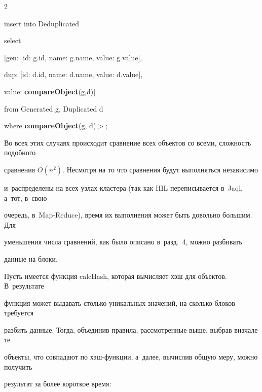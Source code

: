 \begin{multicols}{2}
{\sf



\noindent

  insert into Deduplicated



\noindent

  select



\noindent

  [gen: [id: g.id, name: g.name, value: g.value],



\noindent

  dup: [id: d.id, name: d.name, value: d.value],



\noindent

  value: {\textbf{compareObject}}(g,d)]



\noindent

  from Generated g, Duplicated d



\noindent

  where {\textbf{compareObject}}(g, d)\;$>$;

  }



  Во всех этих случаях происходит сравнение всех объектов со всеми, сложность подобного

сравнения $O(n^2)$. Несмотря на то что сравнения будут выполняться независимо

и~распределены на всех узлах кластера (так как HIL переписывается в~Jaql, а~тот, в~свою

очередь, в~Map-Reduce), время их выполнения может быть довольно большим. Для

уменьшения числа сравнений, как было описано в~разд.~4, можно разбивать

данные на блоки.



  Пусть имеется функция {\sf calcHash}, которая вычисляет хэш для объектов. В~результате

функция может выдавать столько уникальных значений, на сколько блоков требуется

разбить данные. Тогда, объединив правила, рассмотренные выше, выбрав вначале те

объекты, что совпадают по хэш-функ\-ции, а~далее, вычислив общую меру, можно получить

результат за более короткое время:




\end{multicols}
